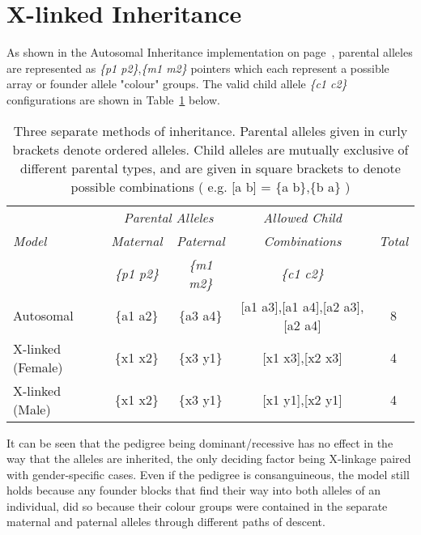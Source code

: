 \section{X-linked Inheritance}

As shown in the Autosomal Inheritance implementation on page~\pageref{ref:haplo:aim}, parental alleles are represented as \textit{\{p1 p2\}},\textit{\{m1 m2\}} pointers which each represent a possible array or founder allele "colour" groups. The valid child allele \textit{\{c1 c2\}} configurations are shown in Table~\ref{table:haplo:methofinh} below.

\begin{table}[h]
\begin{center}
\begin{tabular}{ l *4c } \toprule
             & \multicolumn{2}{c}{\emph{Parental Alleles}} & \emph{Allowed Child} &              \\
\emph{Model} & \emph{Maternal}  & \emph{Paternal}  &        \emph{Combinations}   & \emph{Total} \\
             & \emph{\{p1 p2\}} & \emph{\{m1 m2\}} &        \emph{\{c1 c2\}}      &              \\
\midrule
Autosomal         & \{a1 a2\} & \{a3 a4\} & [a1 a3],[a1 a4],[a2 a3],[a2 a4] & 8 \\
X-linked (Female) & \{x1 x2\} & \{x3 y1\} & [x1 x3],[x2 x3]                 & 4 \\
X-linked (Male)   & \{x1 x2\} & \{x3 y1\} & [x1 y1],[x2 y1]                 & 4 \\
\hline
\end{tabular}
\end{center}
\caption[Three means of allele inheritance]{Three separate methods of inheritance. Parental alleles given in curly brackets denote ordered alleles. Child alleles are mutually exclusive of different parental types, and are given in square brackets to denote possible combinations ( e.g. [a b] = \{a b\},\{b a\} )}\label{table:haplo:methofinh}
\end{table}

It can be seen that the pedigree being dominant/recessive has no effect in the way that the alleles are inherited, the only deciding factor being X-linkage paired with gender-specific cases. Even if the pedigree is consanguineous, the model still holds because any founder blocks that find their way into both alleles of an individual, did so because their colour groups were contained in the separate maternal and paternal alleles through different paths of descent.

